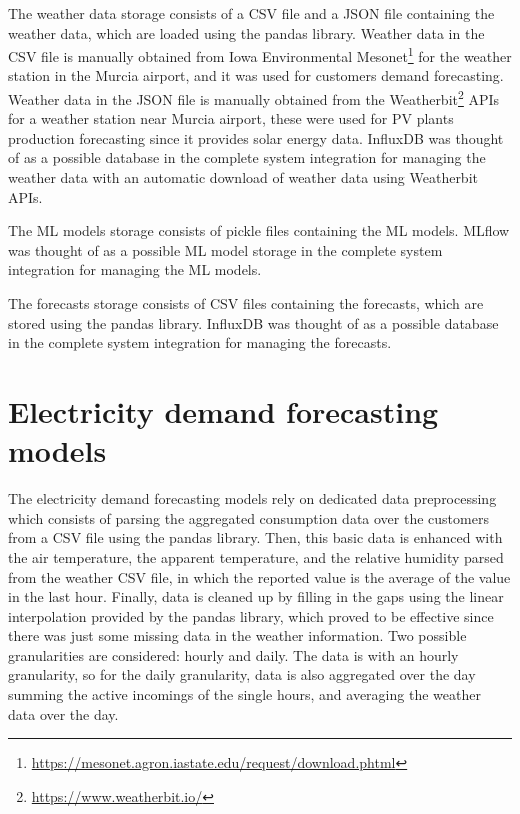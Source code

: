 The weather data storage consists of a CSV file and a JSON file containing the weather data, which are loaded using the pandas library.
Weather data in the CSV file is manually obtained from Iowa Environmental Mesonet\footnote{ \url{https://mesonet.agron.iastate.edu/request/download.phtml} } for the weather station in the Murcia airport, and it was used for customers demand forecasting.
Weather data in the JSON file is manually obtained from the Weatherbit\footnote{ \url{https://www.weatherbit.io/} } APIs for a weather station near Murcia airport, these were used for PV plants production forecasting since it provides solar energy data.
InfluxDB was thought of as a possible database in the complete system integration for managing the weather data with an automatic download of weather data using Weatherbit APIs.

The ML models storage consists of pickle files containing the ML models.
MLflow was thought of as a possible ML model storage in the complete system integration for managing the ML models.

The forecasts storage consists of CSV files containing the forecasts, which are stored using the pandas library.
InfluxDB was thought of as a possible database in the complete system integration for managing the forecasts.


\section{Electricity demand forecasting models}
\label{sec:demandimpl}
\vspace{0.2 cm}

The electricity demand forecasting models rely on dedicated data preprocessing which consists of parsing the aggregated consumption data over the customers from a CSV file using the pandas library.
Then, this basic data is enhanced with the air temperature, the apparent temperature, and the relative humidity parsed from the weather CSV file, in which the reported value is the average of the value in the last hour.
Finally, data is cleaned up by filling in the gaps using the linear interpolation provided by the pandas library, which proved to be effective since there was just some missing data in the weather information.
Two possible granularities are considered: hourly and daily.
The data is with an hourly granularity, so for the daily granularity, data is also aggregated over the day summing the active incomings of the single hours, and averaging the weather data over the day.

